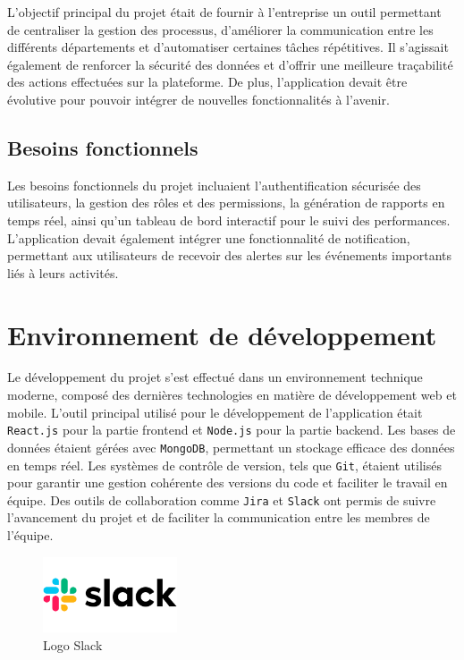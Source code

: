 L'objectif principal du projet était de fournir à l'entreprise un outil permettant de centraliser la gestion des processus, d'améliorer la communication entre les différents départements et d'automatiser certaines tâches répétitives. Il s'agissait également de renforcer la sécurité des données et d'offrir une meilleure traçabilité des actions effectuées sur la plateforme. De plus, l'application devait être évolutive pour pouvoir intégrer de nouvelles fonctionnalités à l'avenir.

\subsection{Besoins fonctionnels}

Les besoins fonctionnels du projet incluaient l'authentification sécurisée des utilisateurs, la gestion des rôles et des permissions, la génération de rapports en temps réel, ainsi qu'un tableau de bord interactif pour le suivi des performances. L'application devait également intégrer une fonctionnalité de notification, permettant aux utilisateurs de recevoir des alertes sur les événements importants liés à leurs activités.

\section{Environnement de développement}

Le développement du projet s'est effectué dans un environnement technique moderne, composé des dernières technologies en matière de développement web et mobile. L'outil principal utilisé pour le développement de l'application était \texttt{React.js} pour la partie frontend et \texttt{Node.js} pour la partie backend. Les bases de données étaient gérées avec \texttt{MongoDB}, permettant un stockage efficace des données en temps réel. Les systèmes de contrôle de version, tels que \texttt{Git}, étaient utilisés pour garantir une gestion cohérente des versions du code et faciliter le travail en équipe. Des outils de collaboration comme \texttt{Jira} et \texttt{Slack} ont permis de suivre l'avancement du projet et de faciliter la communication entre les membres de l'équipe.


\begin{figure}[h]
    \centering
    \includegraphics[width=150px]{LOGOS/Slack-Logo.png}
    \caption{Logo Slack}
    \label{fig:slack}
\end{figure}

